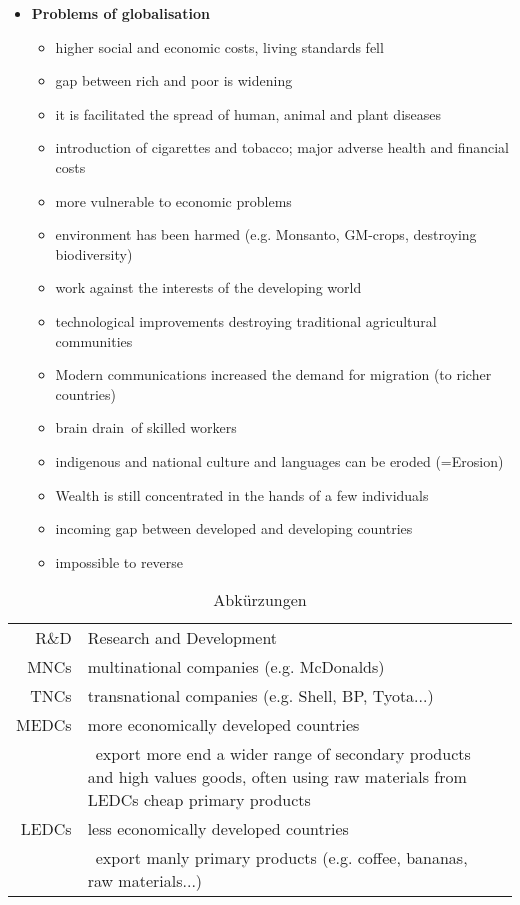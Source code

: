 \documentclass[a5paper,12pt,twoside,titlepage]{scrartcl}
\begin{document}
\begin{itemize}
	\item \textbf{Problems of globalisation}
	\begin{itemize}
		\item higher social and economic costs, living standards fell
		\item gap between rich and poor is widening
		\item it is facilitated the spread of human, animal and plant diseases
		\item introduction of cigarettes and tobacco; major adverse health and financial costs
		\item more vulnerable to economic problems
		\item environment has been harmed (e.g. Monsanto, GM-crops, destroying biodiversity)
		\item work against the interests of the developing world
		\item technological improvements destroying traditional agricultural communities
		\item Modern communications increased the demand for migration (to richer countries) 
		\item \glq brain drain\grq\ of skilled workers
		\item indigenous and national culture and languages can be eroded (\textrightarrow=Erosion)
		\item Wealth is still concentrated in the hands of a few individuals
		\item incoming gap between developed and developing countries
		\item impossible to reverse
	\end{itemize}
\end{itemize}


\begin{table}[h!]
	\caption{Abkürzungen}
	\begin{tabular}{r|p{}l}
		R\&D & Research and Development \\
		MNCs & multinational companies (e.g. McDonalds) \\
		TNCs & transnational companies (e.g. Shell, BP, Tyota...) \\
		MEDCs & more economically developed countries \\
		          & \textrightarrow\ export more end a wider range of secondary products and high values goods, often using raw materials from LEDCs \textrightarrow cheap primary products \\
		LEDCs & less economically developed countries \\
				& \textrightarrow\ export manly primary products (e.g. coffee, bananas, raw materials...)
		
	\end{tabular}
\end{table}
\end{document}
